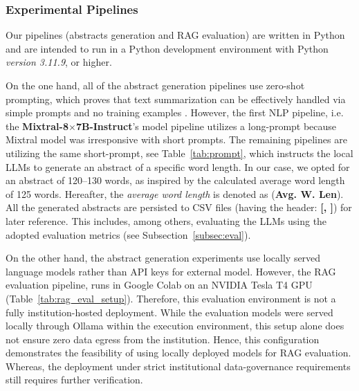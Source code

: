 \documentclass[bdcc,article,submit,pdftex,moreauthors]{Definitions/mdpi}
\begin{document}
\subsubsection{Experimental Pipelines}
Our pipelines (abstracts generation and RAG evaluation) are written in Python and are intended to run in a Python development environment with Python \textit{version 3.11.9}, or higher. %

On the one hand, all of the abstract generation pipelines use zero-shot prompting, which proves that text summarization can be effectively handled via simple prompts and no training examples \cite{zhang-etal-2024-benchmarking}. However, the first NLP pipeline, i.e. the \textbf{Mixtral-8$\times$7B-Instruct}'s model pipeline utilizes a long-prompt because Mixtral model was irresponsive with short prompts. The remaining pipelines are utilizing the same short-prompt, see Table~\ref{tab:prompt}, which instructs the local LLMs to generate an abstract of a specific word length. In our case, we opted for an abstract of 120--130 words, as inspired by the calculated average word length of 125 words. %
Hereafter, the \textit{average word length} is denoted as (\textbf{Avg. W. Len}). All the generated abstracts are persisted to CSV files (having the header: \textbf{ [,  ]}) for later reference. This includes, among others, evaluating the LLMs using the adopted evaluation metrics (see Subsection~\ref{subsec:eval}).

On the other hand, the abstract generation experiments use locally served language models rather than API keys for external model. However, the RAG evaluation pipeline, runs in Google Colab on an NVIDIA Tesla T4 GPU (Table~\ref{tab:rag_eval_setup}). Therefore, this evaluation environment is not a fully institution-hosted deployment. While the evaluation models were served locally through Ollama within the execution environment, this setup alone does not ensure zero data egress from the institution.
Hence, this configuration demonstrates the feasibility of using locally deployed models for RAG evaluation. Whereas, the deployment under strict institutional data-governance requirements still requires further verification.
\end{document}
